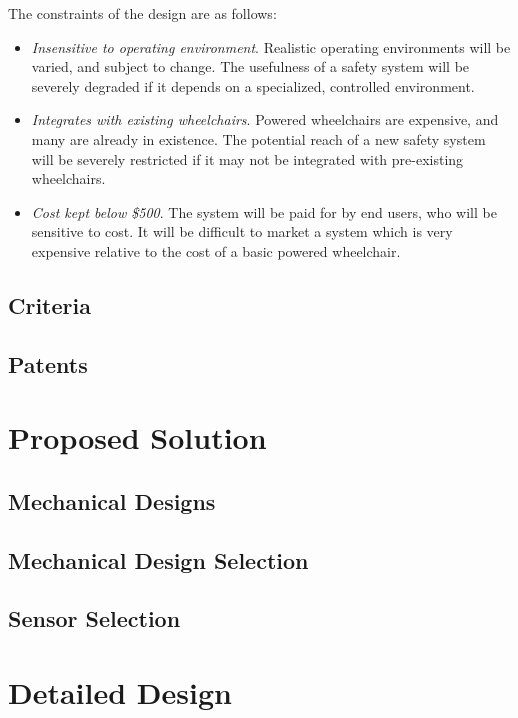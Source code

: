 \documentclass[oneside,final]{report}
\begin{document}
The constraints of the design are as follows:

\begin{itemize}
 \item \emph{Insensitive to operating environment}.  Realistic operating environments will be varied, and subject to change.  The usefulness of a safety system will be severely degraded if it depends on a specialized, controlled environment.
 \item \emph{Integrates with existing wheelchairs}.  Powered wheelchairs are expensive, and many are already in existence.  The potential reach of a new safety system will be severely restricted if it may not be integrated with pre-existing wheelchairs.
 \item \emph{Cost kept below \$500}.  The system will be paid for by end users, who will be sensitive to cost.  It will be difficult to market a system which is very expensive relative to the cost of a basic powered wheelchair.
\end{itemize}

\section{Criteria}

\section{Patents}


\chapter{Proposed Solution}

\section{Mechanical Designs}

\section{Mechanical Design Selection}

\section{Sensor Selection}


\chapter{Detailed Design}
\end{document}
